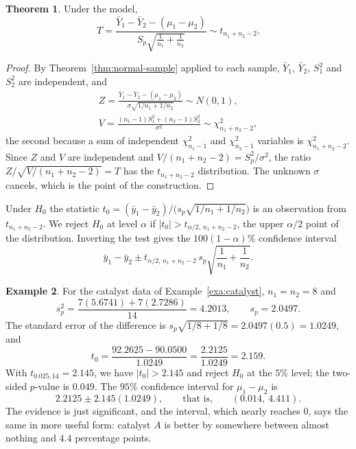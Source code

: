 \documentclass[11pt,a4paper]{article}
\numberwithin{equation}{section}
\theoremstyle{definition}
\newtheorem{thm}{Theorem}[subsection]
\newtheorem{exa}[thm]{Example}
\begin{document}
\begin{thm}\label{thm:two-sample-t}
Under the model,
\[
T = \frac{\bar Y_1 - \bar Y_2 - (\mu_1 - \mu_2)}{S_p\sqrt{\frac{1}{n_1} + \frac{1}{n_2}}} \sim t_{n_1+n_2-2} .
\]
\end{thm}

\begin{proof}
By Theorem~\ref{thm:normal-sample} applied to each sample, $\bar Y_1$, $\bar Y_2$, $S_1^2$ and $S_2^2$ are independent, and
\begin{gather*}
Z = \frac{\bar Y_1 - \bar Y_2 - (\mu_1 - \mu_2)}{\sigma\sqrt{1/n_1 + 1/n_2}} \sim N(0, 1) , \\
V = \frac{(n_1 - 1)S_1^2 + (n_2 - 1)S_2^2}{\sigma^2} \sim \chi^2_{n_1+n_2-2} ,
\end{gather*}
the second because a sum of independent $\chi^2_{n_1-1}$ and $\chi^2_{n_2-1}$ variables is $\chi^2_{n_1+n_2-2}$. Since $Z$ and $V$ are independent and
$V/(n_1 + n_2 - 2) = S_p^2/\sigma^2$, the ratio $Z/\sqrt{V/(n_1 + n_2 - 2)} = T$ has the $t_{n_1+n_2-2}$ distribution. The unknown $\sigma$ cancels, which is the
point of the construction.
\end{proof}

Under $H_0$ the statistic $t_0 = (\bar y_1 - \bar y_2)/\bigl(s_p\sqrt{1/n_1 + 1/n_2}\bigr)$ is an observation from $t_{n_1+n_2-2}$. We reject $H_0$ at level $\alpha$ if
$|t_0| > t_{\alpha/2,\,n_1+n_2-2}$, the upper $\alpha/2$ point of the distribution. Inverting the test gives the $100(1 - \alpha)\%$ confidence interval
\[
\bar y_1 - \bar y_2 \pm t_{\alpha/2,\,n_1+n_2-2}\,s_p\sqrt{\frac{1}{n_1} + \frac{1}{n_2}} .
\]

\begin{exa}\label{exa:catalyst-t}
For the catalyst data of Example~\ref{exa:catalyst}, $n_1 = n_2 = 8$ and
\[
s_p^2 = \frac{7(5.6741) + 7(2.7286)}{14} = 4.2013 , \qquad s_p = 2.0497 .
\]
The standard error of the difference is $s_p\sqrt{1/8 + 1/8} = 2.0497(0.5) = 1.0249$, and
\[
t_0 = \frac{92.2625 - 90.0500}{1.0249} = \frac{2.2125}{1.0249} = 2.159 .
\]
With $t_{0.025,14} = 2.145$, we have $|t_0| > 2.145$ and reject $H_0$ at the $5\%$ level; the two-sided $p$-value is $0.049$. The $95\%$ confidence interval
for $\mu_1 - \mu_2$ is
\[
2.2125 \pm 2.145(1.0249) , \qquad\text{that is,}\qquad (0.014,\ 4.411) .
\]
The evidence is just significant, and the interval, which nearly reaches $0$, says the same in more useful form: catalyst $A$ is better by
somewhere between almost nothing and $4.4$ percentage points.
\end{exa}
\end{document}
